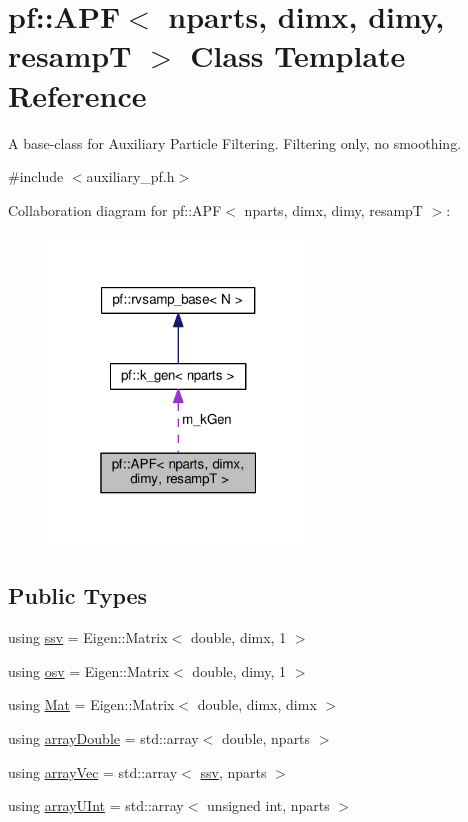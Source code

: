 \hypertarget{classpf_1_1APF}{}\section{pf\+:\+:A\+PF$<$ nparts, dimx, dimy, resampT $>$ Class Template Reference}
\label{classpf_1_1APF}


A base-\/class for Auxiliary Particle Filtering. Filtering only, no smoothing.  




{\ttfamily \#include $<$auxiliary\+\_\+pf.\+h$>$}



Collaboration diagram for pf\+:\+:A\+PF$<$ nparts, dimx, dimy, resampT $>$\+:\nopagebreak
\begin{figure}[H]
\begin{center}
\leavevmode
\includegraphics[width=196pt]{classpf_1_1APF__coll__graph}
\end{center}
\end{figure}
\subsection*{Public Types}
\begin{DoxyCompactItemize}
\item 
using \hyperlink{classpf_1_1APF_aa7fe7efd37dc23b06812aebdee256897}{ssv} = Eigen\+::\+Matrix$<$ double, dimx, 1 $>$
\item 
using \hyperlink{classpf_1_1APF_a852db242b5d02c58dc4e6a183a8cab65}{osv} = Eigen\+::\+Matrix$<$ double, dimy, 1 $>$
\item 
using \hyperlink{classpf_1_1APF_a771c0848fc35bf75e2d3f93bc4ee42ab}{Mat} = Eigen\+::\+Matrix$<$ double, dimx, dimx $>$
\item 
using \hyperlink{classpf_1_1APF_a4500221db97fe6af28b91fcc907bcc04}{array\+Double} = std\+::array$<$ double, nparts $>$
\item 
using \hyperlink{classpf_1_1APF_a62d28b3fa148d8f3fba03e4a1fb92b81}{array\+Vec} = std\+::array$<$ \hyperlink{classpf_1_1APF_aa7fe7efd37dc23b06812aebdee256897}{ssv}, nparts $>$
\item 
using \hyperlink{classpf_1_1APF_aca139948a9e7b0432afdcae7d2ffba01}{array\+U\+Int} = std\+::array$<$ unsigned int, nparts $>$
\end{DoxyCompactItemize}
